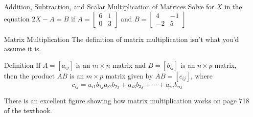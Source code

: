 \documentclass[t]{beamer}
\newcommand{\fp}[1]{\left({#1}\right)} %
\newcommand{\fb}[1]{\left[{#1}\right]} %
\begin{document}
	\begin{frame}{Addition, Subtraction, and Scalar Multiplication of Matrices}
		Solve for $X$ in the equation $2X - A = B$ if $A = \begin{bmatrix}
		6 & 1 \\ 0 & 3
		\end{bmatrix}$ and $B = \begin{bmatrix}
		4 & -1 \\ -2 & 5
		\end{bmatrix}$
		\begin{flalign*}
		\onslide<4->{X &= \dfrac12 \fp{\begin{bmatrix}
				10 & 0 \\ -2 & 8
				\end{bmatrix}} & \\}
		\end{flalign*}
	\end{frame}

	\begin{frame}{Matrix Multiplication}
		The definition of matrix multiplication isn't what you'd assume it is.
		
		\begin{block}{Definition}
			If $A = \fb{a_{ij}}$ is an $m \times n$ matrix and $B = \fb{b_{ij}}$ is an $n \times p$ matrix, then the product $AB$ is an $m \times p$ matrix given by $AB = \fb{c_{ij}}$, where $$c_{ij} = a_{i1}b_{1j} a_{i2}b_{2j} + a_{i3}b_{3j} + \cdots + a_{in}b_{nj}$$
		\end{block} \pause
	
		There is an excellent figure showing how matrix multiplication works on page 718 of the textbook.
	\end{frame}
\end{document}
